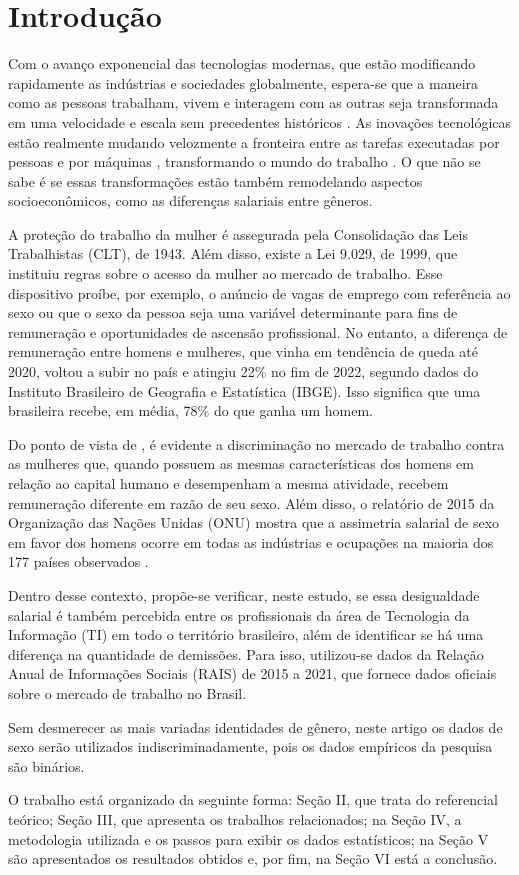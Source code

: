 \section{Introdução}

Com o avanço exponencial das tecnologias modernas, que estão modificando rapidamente as indústrias e sociedades globalmente, espera-se que a maneira como as pessoas trabalham, vivem e interagem com as outras seja transformada em uma velocidade e escala sem precedentes históricos \cite{hand1981artificial}. As inovações tecnológicas estão realmente mudando velozmente a fronteira entre as tarefas executadas por pessoas e por máquinas , transformando o mundo do trabalho \cite{aksoy2021robots}. O que não se sabe é se essas transformações estão também remodelando aspectos socioeconômicos, como as diferenças salariais entre gêneros.

A proteção do trabalho da mulher é assegurada pela Consolidação das Leis Trabalhistas (CLT), de 1943. Além disso, existe a Lei 9.029, de 1999, que instituiu regras sobre o acesso da mulher ao mercado de trabalho. Esse dispositivo proíbe, por exemplo, o anúncio de vagas de emprego com referência ao sexo ou que o sexo da pessoa seja uma variável determinante para fins de remuneração e oportunidades de ascensão profissional. No entanto, a diferença de remuneração entre homens e mulheres, que vinha em tendência de queda até 2020, voltou a subir no país e atingiu 22\% no fim de 2022, segundo dados do Instituto Brasileiro de Geografia e Estatística (IBGE). Isso significa que uma brasileira recebe, em média, 78\% do que ganha um homem.

Do ponto de vista de \cite{ahmed2015human}, é evidente a discriminação no mercado de trabalho contra as mulheres que, quando possuem as mesmas características dos homens em relação ao capital humano e desempenham a mesma atividade, recebem remuneração diferente em razão de seu sexo. Além disso, o relatório de 2015 da Organização das Nações Unidas (ONU) mostra que a assimetria salarial de sexo em favor dos homens ocorre em todas as indústrias e ocupações na maioria dos 177 países observados \cite{report2015onu}.

Dentro desse contexto, propõe-se verificar, neste estudo, se essa desigualdade salarial é também percebida entre os profissionais da área de Tecnologia da Informação (TI) em todo o território brasileiro, além de identificar se há uma diferença na quantidade de demissões. Para isso, utilizou-se dados da Relação Anual de Informações Sociais (RAIS) de 2015 a 2021, que fornece dados oficiais sobre o mercado de trabalho no Brasil. 

Sem desmerecer as mais variadas identidades de gênero, neste artigo os dados de sexo serão utilizados indiscriminadamente, pois os dados empíricos da pesquisa são binários.

O trabalho está organizado da seguinte forma: Seção II, que trata do referencial teórico; Seção III, que apresenta os trabalhos relacionados; na Seção IV, a metodologia utilizada e os passos para exibir os dados estatísticos; na Seção V são apresentados os resultados obtidos e, por fim, na Seção VI está a conclusão.